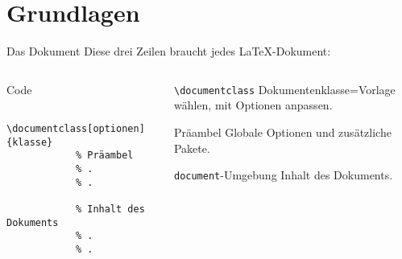 \section{Grundlagen}

\begin{frame}[fragile]{Das Dokument}
  Diese drei Zeilen braucht jedes \LaTeX-Dokument:
  \begin{columns}[onlytextwidth, t]
    \begin{column}{0.48\textwidth}
      \begin{block}{Code}
        \begin{lstlisting}
          \documentclass[optionen]{klasse}
            % Präambel
            % .
            % .
          
            % Inhalt des Dokuments
            % .
            % .
          
        \end{lstlisting}
      \end{block}
    \end{column}
    \begin{column}{0.48\textwidth}
      \begin{block}{\texttt{\textbackslash documentclass}}
        Dokumentenklasse=Vorlage wählen, mit Optionen anpassen.
      \end{block}
      \begin{block}{Präambel}
        Globale Optionen und zusätzliche Pakete.
      \end{block}
      \begin{block}{\texttt{document}-Umgebung}
        Inhalt des Dokuments.
      \end{block}
    \end{column}
  \end{columns}
\end{frame}

